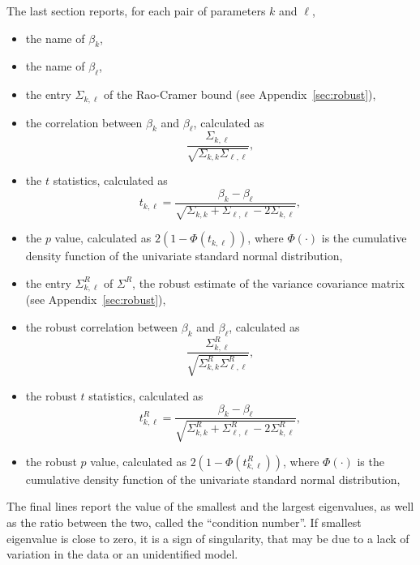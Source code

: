 \documentclass[12pt,a4paper]{article}
\begin{document}
The last section reports, for each pair of parameters $k$ and
$\ell$,
\begin{itemize}
\item the name of $\beta_k$,
\item the name of $\beta_\ell$,
\item the entry $\Sigma_{k,\ell}$ of the 
         Rao-Cramer bound (see Appendix~\ref{sec:robust}),
\item the correlation between $\beta_k$ and $\beta_\ell$, calculated as
\begin{equation}
\frac{\Sigma_{k,\ell}}{\sqrt{\Sigma_{k,k}\Sigma_{\ell,\ell}}},
\end{equation}
\item the $t$ statistics, calculated as
\begin{equation}
t_{k,\ell}= \frac{\beta_k - \beta_\ell}{\sqrt{\Sigma_{k,k} + \Sigma_{\ell,\ell} - 2 \Sigma_{k,\ell}}},
\end{equation}
  \item the $p$ value, calculated as $2 (1 - \Phi(t_{k,\ell}))$,
where $\Phi(\cdot)$ is the cumulative density function of the
univariate standard normal distribution,
\item the entry $\Sigma^R_{k,\ell}$ of $\Sigma^R$, the robust estimate of the variance covariance matrix (see Appendix~\ref{sec:robust}),
\item the robust correlation between $\beta_k$ and $\beta_\ell$, calculated as
\begin{equation}
\frac{\Sigma^R_{k,\ell}}{\sqrt{\Sigma^R_{k,k}\Sigma^R_{\ell,\ell}}},
\end{equation}
\item the robust $t$ statistics, calculated as
\begin{equation}
t^R_{k,\ell}=\frac{\beta_k - \beta_\ell}{\sqrt{\Sigma^R_{k,k} + \Sigma^R_{\ell,\ell}
    - 2 \Sigma^R_{k,\ell}}},
\end{equation}
     \item the robust $p$ value, calculated as $2 (1 - \Phi(t^R_{k,\ell}))$,
where $\Phi(\cdot)$ is the cumulative density function of the
univariate standard normal distribution,
\end{itemize}
The final lines report the value of the smallest and the largest
eigenvalues, as well as the ratio between the two, called the
``condition number''.   If smallest eigenvalue is close to zero, it is a sign of
singularity, that may be due to a lack of variation in the data or
an unidentified model.
\end{document}
